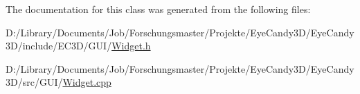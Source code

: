 The documentation for this class was generated from the following files\+:\begin{DoxyCompactItemize}
\item 
D\+:/\+Library/\+Documents/\+Job/\+Forschungsmaster/\+Projekte/\+Eye\+Candy3\+D/\+Eye\+Candy3\+D/include/\+E\+C3\+D/\+G\+U\+I/\mbox{\hyperlink{_widget_8h}{Widget.\+h}}\item 
D\+:/\+Library/\+Documents/\+Job/\+Forschungsmaster/\+Projekte/\+Eye\+Candy3\+D/\+Eye\+Candy3\+D/src/\+G\+U\+I/\mbox{\hyperlink{_widget_8cpp}{Widget.\+cpp}}\end{DoxyCompactItemize}
